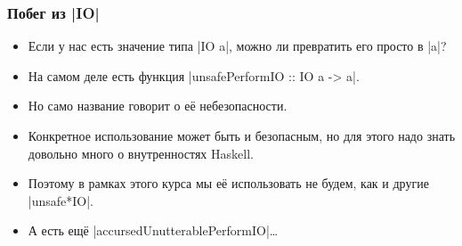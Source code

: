 \documentclass[11pt]{beamer}
\begin{document}
\begin{frame}[fragile]
  \frametitle{Побег из \haskinline|IO|}
  \begin{itemize}
    \item Если у нас есть значение типа \haskinline|IO a|, можно ли превратить его просто в \haskinline|a|?
          \pause
    \item На самом деле есть функция \haskinline|unsafePerformIO :: IO a -> a|.
    \item Но само название говорит о её небезопасности.
    \item Конкретное использование может быть и безопасным, но для этого надо знать довольно много о внутренностях Haskell.
          \pause
    \item Поэтому в рамках этого курса мы её использовать не будем, как и другие \haskinline|unsafe*IO|.
    \item А есть ещё \haskinline|accursedUnutterablePerformIO|\ldots
  \end{itemize}
\end{frame}

\end{document}
